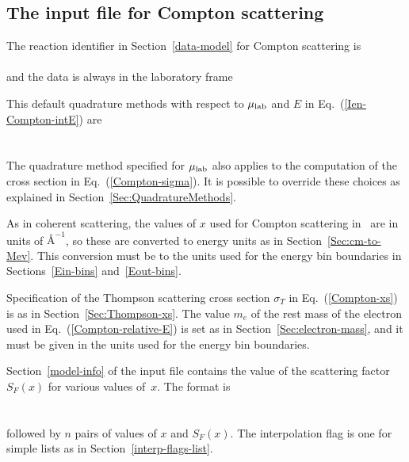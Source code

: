 \subsection{The input file for Compton scattering}
The reaction identifier in Section~\ref{data-model} for
Compton scattering is\\
  \\
and the data is always in the laboratory frame\\

This default quadrature methods with respect to $\mu_{\text{lab}}$ 
and $E$ in Eq.~(\ref{Ien-Compton-intE}) are\\
    \\
    \\
The quadrature method specified for $\mu_{\text{lab}}$ also applies to the computation of
the cross section in Eq.~(\ref{Compton-sigma}).  It is possible
to override these choices as explained in
Section~\ref{Sec:QuadratureMethods}.

As in coherent scattering, the values of $x$ used for Compton
scattering in \xendl\ are in units of $\text{\AA}^{-1}$, so these are
converted to energy units as in Section~\ref{Sec:cm-to-Mev}.  This
conversion must be to the units used for the energy bin boundaries in
Sections~\ref{Ein-bins} and~\ref{Eout-bins}.

Specification of the Thompson scattering cross section $\sigma_T$
in Eq.~(\ref{Compton-xs}) is as in Section~\ref{Sec:Thompson-xs}.
The value $m_e$ of the rest mass of the electron used in
Eq.~(\ref{Compton-relative-E}) is set as
in Section~\ref{Sec:electron-mass}, and it must be given
in the units used for the energy bin boundaries.

Section~\ref{model-info} of the input file contains the value of the
scattering factor $S_F(x)$ for various values of~$x$.  The format is\\
    \\
    \\
followed by $n$ pairs of values of $x$ and $S_F(x)$.    The interpolation
flag is one for simple lists as in Section~\ref{interp-flags-list}.

